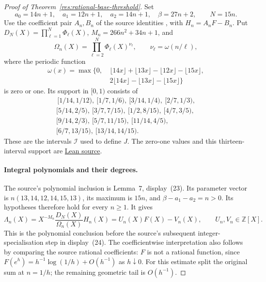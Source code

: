 \documentclass[11pt]{article}
\begin{document}
\begin{proof}[Proof of Theorem~\ref{res:rational-base-threshold}]
Set
\[
 a_0=14n+1,\quad a_1=12n+1,\quad a_2=14n+1,\quad\beta=27n+2,
 \qquad N=15n.
\]
Use the coefficient pair $A_n,B_n$ of the source identities
\cite[(8)--(11)]{zudilin2004}, with $H_n=A_nF-B_n$.
Put $D_N(X)=\prod_{\ell=1}^{N}\Phi_\ell(X)$,
$M_n=266n^2+34n+1$, and
\[
 \Omega_n(X)=\prod_{\ell=2}^{N}\Phi_\ell(X)^{\nu_\ell},
 \qquad \nu_\ell=\omega(n/\ell),
\]
where the periodic function
\[
\begin{split}
\omega(x)=\max\{0,&\ \lfloor14x\rfloor+\lfloor13x\rfloor
                  -\lfloor12x\rfloor-\lfloor15x\rfloor,\\
                &\ 2\lfloor14x\rfloor-\lfloor13x\rfloor
                  -\lfloor15x\rfloor\}
\end{split}
\]
is zero or one.  Its support in $[0,1)$ consists of
\[
\begin{gathered}
\,[1/14,1/12),\ [1/7,1/6),\ [3/14,1/4),\ [2/7,1/3),\\
[5/14,2/5),\ [3/7,7/15),\ [1/2,8/15),\ [4/7,3/5),\\
[9/14,2/3),\ [5/7,11/15),\ [11/14,4/5),\\
[6/7,13/15),\ [13/14,14/15).
\end{gathered}
\]
These are the intervals $\mathcal I$ used to define $J$.
The zero-one values and this thirteen-interval support are
\href{https://github.com/wcook04/plectis-erdos/blob/f36a98bf3d3e6f65f1074e3b800e3293d5b8a51a/ErdosProblems/Erdos1049/PaperOmegaIndicatorR7.lean#L1297}{Lean source}.

\paragraph{Integral polynomials and their degrees.}
The source's polynomial inclusion is Lemma~7, display~(23).
Its parameter vector is $n(13,14,12,14,15,13)$, its maximum is $15n$, and
$\beta-a_1-a_2=n>0$.  Its hypotheses therefore hold for every $n\ge1$.
It gives
\[
 \Lambda_n(X)=X^{-M_n}\frac{D_N(X)}{\Omega_n(X)}H_n(X)
            =U_n(X)F(X)-V_n(X),\qquad U_n,V_n\in\mathbb Z[X].
\]
This is the polynomial conclusion before the source's subsequent
integer-specialisation step in display~(24).
The coefficientwise interpretation also follows by comparing the source
rational coefficients: $F$ is not a rational function, since
$F(e^h)=h^{-1}\log(1/h)+O(h^{-1})$ as $h\downarrow0$.
For this estimate split the original sum at $n=1/h$; the remaining geometric
tail is $O(h^{-1})$.


\end{proof}
\end{document}
